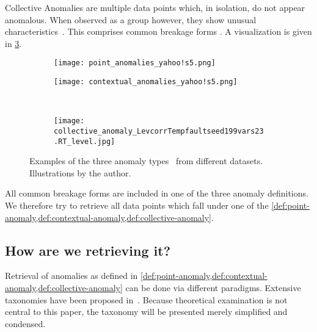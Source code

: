 \begin{definition}\label{def:collective-anomaly}
    Collective Anomalies are multiple data points which, in isolation, do not appear
    anomalous. When observed as a group however, they show unusual
    characteristics~\cite[cf.][]{Chandola.2009}. This comprises common breakage
    forms . A visualization is given in
    \cref{fig:collective-anomaly}.
\end{definition}

\begin{figure}[htp!]
    \begin{subfigure}[b]{.45\linewidth}
        \centering
        \texttt{[image: point\_anomalies\_yahoo!s5.png]}
        \label{fig:point-anomaly}
    \end{subfigure}%
    \hfill
    \begin{subfigure}[b]{.45\linewidth}
        \centering
        \texttt{[image: contextual\_anomalies\_yahoo!s5.png]}
        \label{fig:contextual-anomaly}
    \end{subfigure}\\[1ex]
    \begin{subfigure}[b]{\linewidth}
        \centering
        \texttt{[image: collective\_anomaly\_LevcorrTempfaultseed199vars23.RT\_level.jpg]}
        \label{fig:collective-anomaly}
    \end{subfigure}
    \caption{Examples of the three anomaly types~\cite{Chandola.2009} from different datasets. Illustrations by the author.}\label{fig:anomaly-types}
\end{figure}

All common breakage forms are included in one of the three anomaly definitions.
We therefore try to retrieve all data points which fall under one of the
\cref{def:point-anomaly,def:contextual-anomaly,def:collective-anomaly}.


\subsection{How are we retrieving it?}\label{subsect:how-are-we-retrieving-it}
Retrieval of anomalies as defined in \cref{def:point-anomaly,def:contextual-anomaly,def:collective-anomaly}
can be done via different paradigms. Extensive taxonomies have been proposed in~\cite{Chandola.2009,Zietlow.2020}.
Because theoretical examination is not central to this paper, the taxonomy will
be presented merely simplified and condensed.

